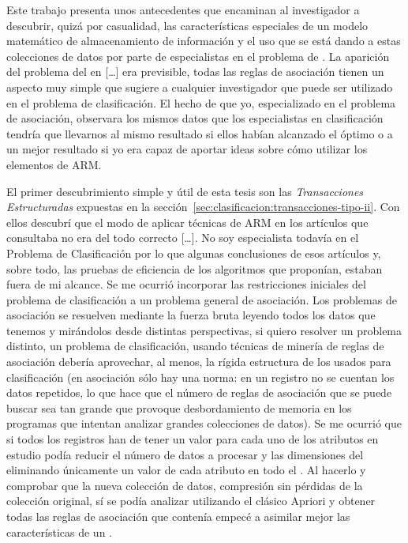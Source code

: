 Este trabajo presenta unos antecedentes que encaminan al investigador a descubrir, quizá por casualidad, las características especiales de un modelo matemático de almacenamiento de información y el uso que se está dando a estas colecciones de datos por parte de especialistas en el problema de \clasificacion. La aparición del problema del \carm en [\ldots] era previsible, todas las reglas de asociación tienen un aspecto muy simple que sugiere a cualquier investigador que puede ser utilizado en el problema de clasificación. El hecho de que yo, especializado en el problema de asociación, observara los mismos datos que los especialistas en clasificación tendría que llevarnos al mismo resultado si ellos habían alcanzado el óptimo o a un mejor resultado si yo era capaz de aportar ideas sobre cómo utilizar los elementos de ARM.

El primer descubrimiento simple y útil de esta tesis son las \emph{Transacciones Estructuradas} expuestas en la sección~\ref{sec:clasificacion:transacciones-tipo-ii}. Con ellos descubrí que el modo de aplicar técnicas de ARM en los artículos que consultaba no era del todo correcto  [\ldots]. No soy especialista todavía en el Problema de Clasificación por lo que algunas conclusiones de esos artículos y, sobre todo, las pruebas de eficiencia de los algoritmos que proponían, estaban fuera de mi alcance. Se me ocurrió incorporar las restricciones iniciales del problema de clasificación a un problema general de asociación. Los problemas de asociación se resuelven mediante la fuerza bruta leyendo todos los datos que tenemos y mirándolos desde distintas perspectivas, si quiero resolver un problema distinto, un problema de clasificación, usando técnicas de minería de reglas de asociación debería aprovechar, al menos, la rígida estructura de los \datasets usados para clasificación (en asociación sólo hay una norma: en un registro no se cuentan los datos repetidos, lo que hace que el número de reglas de asociación que se puede buscar sea tan grande que provoque desbordamiento de memoria en los programas que intentan analizar grandes colecciones de datos). Se me ocurrió que si todos los registros han de tener un valor para cada uno de los atributos en estudio podía reducir el número de datos a procesar y las dimensiones del \dataset eliminando únicamente un valor de cada atributo en todo el \dataset. Al hacerlo y comprobar que la nueva colección de datos, compresión sin pérdidas de la colección original, sí se podía analizar utilizando el clásico Apriori y obtener todas las reglas de asociación que contenía empecé a asimilar mejor las características de un \catalogo.

